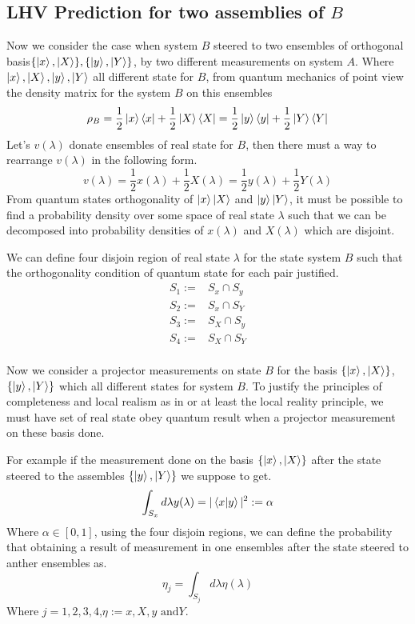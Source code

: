 \subsection{LHV Prediction for two assemblies of $B$}\label{Triv}\hfill \break
Now we consider the case when system $B$ steered to two ensembles of orthogonal basis$\{\ket{x},\ket{X}\},\{\ket{y},\ket{Y}\}$, by two different measurements on system $A$.
Where $\ket{x},\ket{X},\ket{y},\ket{Y}$ all different state for $B$,  from quantum mechanics of point view the density matrix for  the system $B$ on this ensembles
\begin{equation}\label{STTS}
\rho_B=\frac{1}{2}\ket{x}\bra{x}+\frac{1}{2}\ket{X}\bra{X}=\frac{1}{2}\ket{y}\bra{y}+\frac{1}{2}\ket{Y}\bra{Y}
\end{equation}
Let's $v(\lambda)$ donate ensembles of real state for $B$, then there must a way to rearrange $v(\lambda)$ in the following form.
\begin{equation}\label{Hidden}
v(\lambda)=\frac{1}{2}x(\lambda)+\frac{1}{2}X(\lambda)=\frac{1}{2}y(\lambda)+\frac{1}{2}Y(\lambda)
\end{equation}
From quantum states orthogonality of $\ket{x} \ket{X}$ and  $\ket{y} \ket{Y}$, it must be possible to find a probability density over some space of real state $\lambda$ such that we can be decomposed into probability densities of $x(\lambda)$ and $X(\lambda)$ which are disjoint.

We can define four disjoin region of real state $\lambda$ for the state system $B$  such that the orthogonality condition of quantum state for each pair justified.
\begin{align*}
S_1:=&S_x\cap S_y\\
S_2:=&S_x\cap S_Y\\
S_3:=&S_X\cap S_y\\
S_4:=&S_X\cap S_Y\\
\end{align*}


Now we consider a projector measurements on state $B$ for the basis $\{\ket{x},\ket{X}\}$,$\{\ket{y},\ket{Y}\}$  which all different states for system $B$. To  justify the principles of completeness and local realism as in  \citep{EPR} or at least the local reality principle, we must have set of real state obey quantum result when a projector measurement on these basis done.

For example if the measurement done on the basis $\{\ket{x},\ket{X}\}$ after the state steered to the assembles $\{\ket{y},\ket{Y}\}$ we suppose to get.
\begin{equation}
\int_{S_x} d\lambda y(\lambda)=|\bra{x}\ket{y}|^2:=\alpha
\end{equation}
Where $\alpha \in [0,1]$, using  the four disjoin regions, we can define the probability that obtaining a result of measurement in one ensembles after the state steered to anther ensembles as.
\begin{equation}
\eta_j=\int_{S_j} d\lambda \eta(\lambda)
\end{equation}
Where $j=1,2,3,4$,$\eta:= x,X,y \text{ and} Y$.

